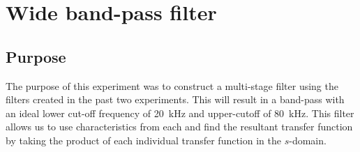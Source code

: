 \documentclass{report}
\begin{document}
\section{Wide band-pass filter}

\subsection{Purpose}
The purpose of this experiment was to construct a multi-stage filter using the filters created in the past two experiments. This will result in a band-pass with an ideal lower cut-off frequency of \SI{20}{\kHz} and upper-cutoff of \SI{80}{\kHz}. This filter allows us to use characteristics from each and find the resultant transfer function by taking the product of each individual transfer function in the $s$-domain.
\end{document}
